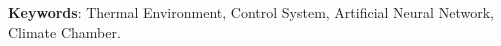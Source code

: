 \lipsum[148-149]

\vspace{0.5cm}
\hspace{-1.2cm}
\textbf{Keywords}: Thermal Environment, Control System, Artificial Neural Network, Climate Chamber.

